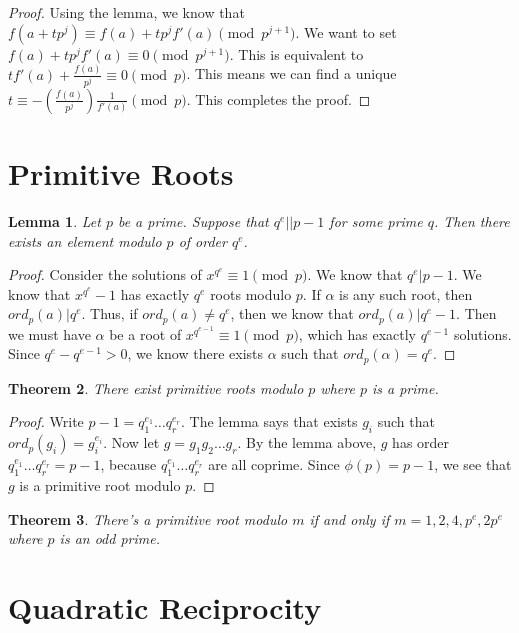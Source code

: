\documentclass[psamsfonts]{amsart}
\newtheorem{thm}{Theorem}[section]
\newtheorem{lem}[thm]{Lemma}
\theoremstyle{definition}
\theoremstyle{remark}
\numberwithin{equation}{section}
\begin{document}
\begin{proof}
Using the lemma, we know that $f(a + t p^j) \equiv f(a) + t p^j f'(a) \pmod{p^{j+1}}$. We want to set $f(a) + t p^j f'(a) \equiv 0 \pmod{p^{j+1}}$. This is equivalent to $t f'(a) + \frac{f(a)}{p^j} \equiv 0 \pmod{p}$. This means we can find a unique $t \equiv - \left( \frac{f(a)}{p^j} \right) \frac{1}{f'(a)} \pmod{p}$. This completes the proof.
\end{proof}

\section{Primitive Roots}

\begin{lem}
Let $p$ be a prime. Suppose that $q^e || p-1$ for some prime $q$. Then there exists an element modulo $p$ of order $q^e$. 
\end{lem}

\begin{proof}
Consider the solutions of $x^{q^e} \equiv 1 \pmod{p}$. We know that $q^e | p- 1$. We know that $x^{q^e} - 1$ has exactly $q^e$ roots modulo $p$. If $\alpha$ is any such root, then $ord_p(a) | q^{e}$. Thus, if $ord_p(a) \neq q^e$, then we know that $ord_p(a) | q^e - 1$. Then we must have $\alpha$ be a root of $x^{q^{e - 1}} \equiv 1 \pmod{p}$, which has exactly $q^{e - 1}$ solutions. Since $q^e - q^{e - 1} > 0$, we know there exists $\alpha$ such that $ord_p(\alpha) = q^e$. 
\end{proof}

\begin{thm}
There exist primitive roots modulo $p$ where $p$ is a prime.
\end{thm}

\begin{proof}
Write $p - 1 = q_1^{e_1} \ldots q_r^{e_r}$. The lemma says that exists $g_i$ such that $ord_p(g_i) = g_i^{e_i}$. Now let $g = g_1 g_2 \ldots g_r$. By the lemma above, $g$ has order $q_1^{e_1} \ldots q_r^{e_r} = p - 1$, because $q_1^{e_1} \ldots q_r^{e_r}$ are all coprime. Since $\phi(p) = p -1$, we see that $g$ is a primitive root modulo $p$. 
\end{proof}

\begin{thm}
There's a primitive root modulo $m$ if and only if $m = 1,2,4, p^e, 2 p^e$ where $p$ is an odd prime. 
\end{thm}

\section{Quadratic Reciprocity}
\end{document}
